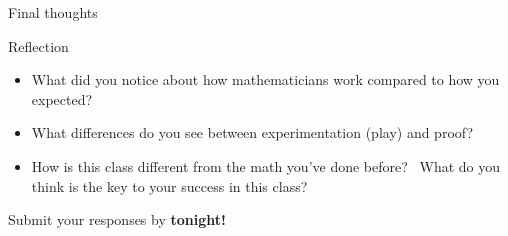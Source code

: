 \documentclass{beamer}
\begin{document}
\begin{frame}{Final thoughts}
  \begin{block}{Reflection}
    \begin{itemize}
      \item What did you notice about how mathematicians work compared to how you expected?
      \item What differences do you see between experimentation (play) and proof?
      \item How is this class different from the math you’ve done before?  What do you think is the key to your success in this class?
    \end{itemize}
  \end{block}
\begin{center}
Submit your responses by \textbf{tonight!}
\end{center}
\end{frame}
\end{document}
